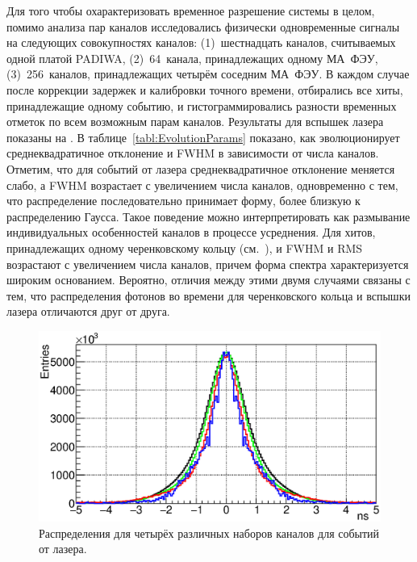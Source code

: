 Для того чтобы охарактеризовать временное разрешение системы в целом, помимо анализа пар каналов исследовались физически одновременные сигналы на следующих совокупностях каналов: (1)~шестнадцать каналов, считываемых одной платой PADIWA, (2)~64~канала, принадлежащих одному МА~ФЭУ, (3)~256~каналов, принадлежащих четырём соседним МА~ФЭУ. В каждом случае после коррекции задержек и калибровки точного времени, отбирались все хиты, принадлежащие одному событию, и гистограммировались разности временных отметок по всем возможным парам каналов. Результаты для вспышек лазера показаны на . В таблице~\ref{tabl:EvolutionParams} показано, как эволюционирует среднеквадратичное отклонение и FWHM в зависимости от числа каналов. Отметим, что для событий от лазера среднеквадратичное отклонение меняется слабо, а FWHM возрастает с увеличением числа каналов, одновременно с тем, что распределение последовательно принимает форму, более близкую к распределению Гаусса. Такое поведение можно интерпретировать как размывание индивидуальных особенностей каналов в процессе усреднения. Для хитов, принадлежащих одному черенковскому кольцу (см.~), и FWHM и RMS возрастают с увеличением числа каналов, причем форма спектра характеризуется широким основанием. Вероятно, отличия между этими двумя случаями связаны с тем, что распределения фотонов во времени для черенковского кольца и вспышки лазера отличаются друг от друга.

\begin{figure}[H]
\centering
\includegraphics[width=1.0\textwidth]{pictures/24_TimePrecision_evolution_laser_feb2017.eps}
\caption{Распределения для четырёх различных наборов каналов для событий от лазера.}
\label{fig:TimeResEvolutionLaser}
\end{figure}

